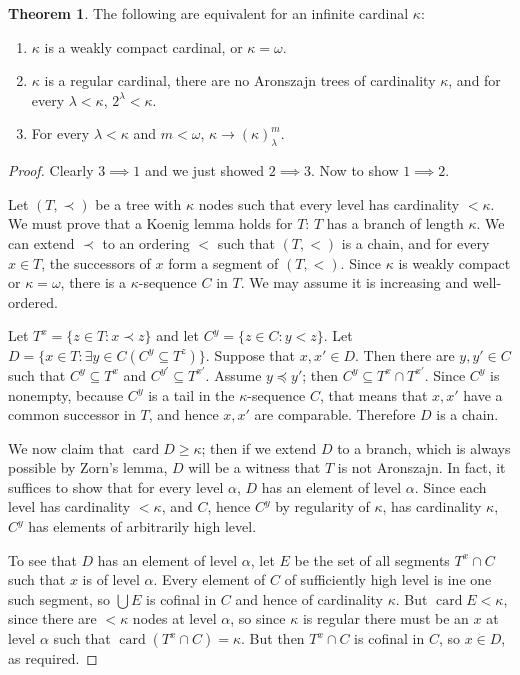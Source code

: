 \documentclass[12pt]{report}
\newcommand{\card}{\operatorname{card}}
\theoremstyle{definition}
\newtheorem{theorem}{Theorem}[chapter]
\begin{document}
\begin{theorem}
The following are equivalent for an infinite cardinal $\kappa$:
\begin{enumerate}
\item $\kappa$ is a weakly compact cardinal, or $\kappa = \omega$.
\item $\kappa$ is a regular cardinal, there are no Aronszajn trees of cardinality $\kappa$, and for every $\lambda < \kappa$, $2^\lambda < \kappa$.
\item For every $\lambda < \kappa$ and $m < \omega$, $\kappa \to (\kappa)_\lambda^m$.
\end{enumerate}
\end{theorem}
\begin{proof}
Clearly $3 \implies 1$ and we just showed $2 \implies 3$. Now to show $1 \implies 2$.

Let $(T, \prec)$ be a tree with $\kappa$ nodes such that every level has cardinality $< \kappa$.
We must prove that a Koenig lemma holds for $T$: $T$ has a branch of length $\kappa$.
We can extend $\prec$ to an ordering $<$ such that $(T, <)$ is a chain, and for every $x \in T$, the successors of $x$ form a segment of $(T, <)$.
Since $\kappa$ is weakly compact or $\kappa = \omega$, there is a $\kappa$-sequence $C$ in $T$. We may assume it is increasing and well-ordered.

Let $T^x = \{z \in T: x \prec z\}$ and let $C^y = \{z \in C: y < z\}$.
Let $D = \{x \in T: \exists y\in C(C^y \subseteq T^z)\}$.
Suppose that $x,x' \in D$. Then there are $y,y' \in C$ such that $C^y \subseteq T^x$ and $C^{y'} \subseteq T^{x'}$.
Assume $y \preceq y'$; then $C^y \subseteq T^x \cap T^{x'}$.
Since $C^y$ is nonempty, because $C^y$ is a tail in the $\kappa$-sequence $C$, that means that $x,x'$ have a common successor in $T$, and hence $x,x'$ are comparable.
Therefore $D$ is a chain.

We now claim that $\card D \geq \kappa$; then if we extend $D$ to a branch, which is always possible by Zorn's lemma, $D$ will be a witness that $T$ is not Aronszajn.
In fact, it suffices to show that for every level $\alpha$, $D$ has an element of level $\alpha$.
Since each level has cardinality $<\kappa$, and $C$, hence $C^y$ by regularity of $\kappa$, has cardinality $\kappa$, $C^y$ has elements of arbitrarily high level.

To see that $D$ has an element of level $\alpha$, let $E$ be the set of all segments $T^x \cap C$ such that $x$ is of level $\alpha$.
Every element of $C$ of sufficiently high level is ine one such segment, so $\bigcup E$ is cofinal in $C$ and hence of cardinality $\kappa$.
But $\card E < \kappa$, since there are $<\kappa$ nodes at level $\alpha$, so since $\kappa$ is regular there must be an $x$ at level $\alpha$ such that $\card(T^x \cap C) = \kappa$.
But then $T^x \cap C$ is cofinal in $C$, so $x \in D$, as required.
\end{proof}
\end{document}

